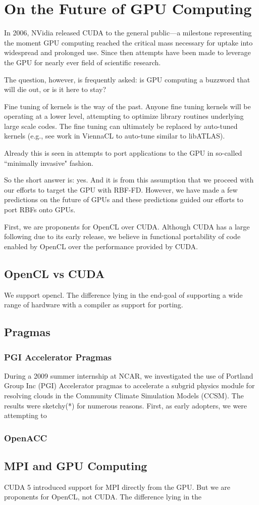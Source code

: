 \chapter{On the Future of GPU Computing}

In 2006, NVidia released CUDA to the general public---a milestone representing the moment GPU computing reached the critical mass necessary for uptake into widespread and prolonged use. Since then attempts have been made to leverage the GPU for nearly ever field of scientific research. 

The question, however, is frequently asked: is GPU computing a buzzword that will die out, or is it here to stay? 

Fine tuning of kernels is the way of the past. Anyone fine tuning kernels will be operating at a lower level, attempting to optimize library routines underlying large scale codes. The fine tuning can ultimately be replaced by auto-tuned kernels (e.g., see work in ViennaCL to auto-tune similar to libATLAS). 

Already this is seen in attempts to port applications to the GPU in so-called ``minimally invasive" fashion. 

So the short answer is: yes. And it is from this assumption that we proceed with our efforts to target the GPU with RBF-FD. However, we have made a few predictions on the future of GPUs and these predictions guided our efforts to port RBFs onto GPUs. 

First, we are proponents for OpenCL over CUDA. Although CUDA has a large following due to its early release, we believe in functional portability of code enabled by OpenCL over the performance provided by CUDA. 

\section{OpenCL vs CUDA}

We support opencl. The difference lying in the end-goal of supporting a wide range of hardware with a compiler as support for porting. 

\section{Pragmas}


\subsection{PGI Accelerator Pragmas}
During a 2009 summer internship at NCAR, we investigated the use of Portland Group Inc (PGI) Accelerator pragmas to accelerate a subgrid physics module for resolving clouds in the Community Climate Simulation Models (CCSM). The results were sketchy(*) for numerous reasons. First, as early adopters, we were attempting to  
\subsection{OpenACC}




\section{MPI and GPU Computing}

CUDA 5 introduced support for MPI directly from the GPU. But we are proponents for OpenCL, not CUDA. The difference lying in the 
